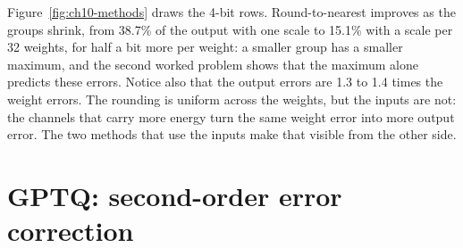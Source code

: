 
\noindent Figure~\ref{fig:ch10-methods} draws the 4-bit rows. Round-to-nearest improves as the groups shrink, from 38.7\% of the
output with one scale to 15.1\% with a scale per 32 weights, for half a bit
more per weight: a smaller group has a smaller maximum, and the second worked
problem shows that the maximum alone predicts these errors. Notice also that
the output errors are 1.3 to 1.4 times the weight errors. The rounding is
uniform across the weights, but the inputs are not: the channels that carry
more energy turn the same weight error into more output error. The two methods
that use the inputs make that visible from the other side.

\section{GPTQ: second-order error correction}

